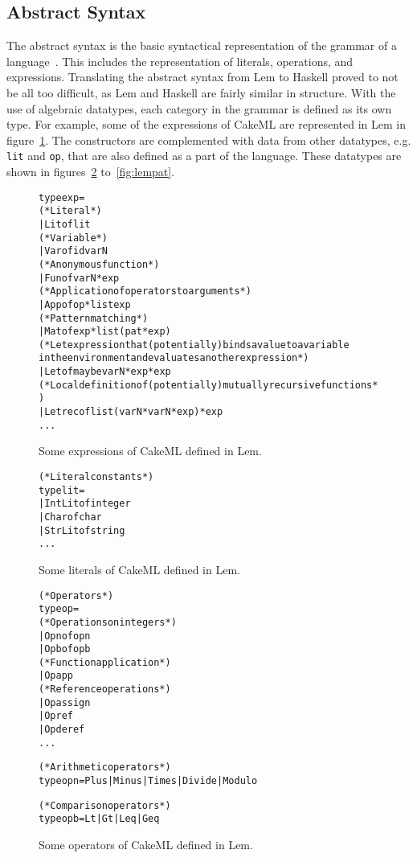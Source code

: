\subsection{Abstract Syntax}
\label{strict:abs}
The abstract syntax is the basic syntactical representation of the grammar of a
language~\cite{pltbook}. This includes the representation of literals,
operations, and expressions. Translating the abstract syntax from Lem to Haskell
proved to not be all too difficult, as Lem and Haskell are fairly similar in
structure. With the use of algebraic datatypes, each category in the grammar is
defined as its own type. For example, some of the expressions of CakeML
are represented in Lem in figure~\ref{fig:lemexp}.
The constructors are complemented with data from other datatypes,
e.g. \texttt{lit} and \texttt{op}, that are also defined as a part of the
language. These datatypes are shown in figures~\ref{fig:lemlit}
to~\ref{fig:lempat}.

\begin{figure}
\begin{alltt}
  type exp =
    (* Literal *)
    | Lit of lit
    (* Variable *)
    | Var of id varN
    (* Anonymous function *)
    | Fun of varN * exp
    (* Application of operators to arguments *)
    | App of op * list exp
    (* Pattern matching *)
    | Mat of exp * list (pat * exp)
    (* Let expression that (potentially) binds a value to a variable
       in the environment and evaluates another expression *)
    | Let of maybe varN * exp * exp
    (* Local definition of (potentially) mutually recursive functions *)
    | Letrec of list (varN * varN * exp) * exp
    ...
\end{alltt}
\caption{Some expressions of CakeML defined in Lem.}
\label{fig:lemexp}
\end{figure}

\begin{figure}
\begin{alltt}
  (* Literal constants *)
  type lit =
    | IntLit of integer
    | Char of char
    | StrLit of string
    ...
\end{alltt}
\caption{Some literals of CakeML defined in Lem.}
\label{fig:lemlit}
\end{figure}

\begin{figure}
\begin{alltt}
  (* Operators *)
  type op =
    (* Operations on integers *)
    | Opn of opn
    | Opb of opb
    (* Function application *)
    | Opapp
    (* Reference operations *)
    | Opassign
    | Opref
    | Opderef
    ...


  (* Arithmetic operators *)
  type opn = Plus | Minus | Times | Divide | Modulo

  (* Comparison operators *)
  type opb = Lt | Gt | Leq | Geq
\end{alltt}
\caption{Some operators of CakeML defined in Lem.}
\label{fig:lemop}
\end{figure}

